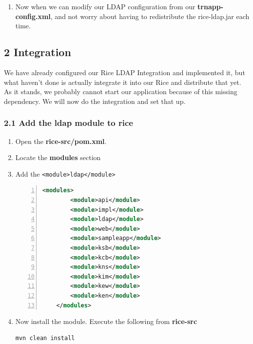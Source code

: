 \begin{enumerate}
\begin{lstlisting}[numbers=left,language=xml,basicstyle=\scriptsize,backgroundcolor=\color{ubergray},caption={trnapp-config.xml},frame=single,breaklines=true]
<param
name="config.location">classpath:META-INF/ldap-config.xml</param>
\lst{listing}
\item Since we are here, change the
  \textbf{rice.additionalSpringFiles} to refer to our new \textbf{KIMLdapSpringBeans.xml}

\begin{lstlisting}[numbers=left,language=xml,basicstyle=\scriptsize,backgroundcolor=\color{ubergray},caption={trnapp-config.xml},frame=single,breaklines=true]
   	<param
    name="rice.additionalSpringFiles">KIMLdapSpringBeans.xml</param>
\end{lstlisting}
\item Now when we can modify our LDAP configuration from our
  \textbf{trnapp-config.xml}, and not worry about having to
  redistribute the rice-ldap.jar each time.
\end{enumerate}

\subsection*{2 Integration}
We have already configured our Rice LDAP Integration and implemented
it, but what haven't done is actually integrate it into our Rice and
distribute that yet. As it stands, we probably cannot start our
application because of this missing dependency. We will now do the
integration and set that up.

\subsubsection*{2.1 Add the ldap module to rice}
\begin{enumerate}
\item Open the \textbf{rice-src/pom.xml}.
\item Locate the \textbf{modules} section
\item Add the \verb|<module>ldap</module>|

\begin{lstlisting}[numbers=left,language=xml,basicstyle=\scriptsize,backgroundcolor=\color{ubergray},caption={rice-src/pom.xml},frame=single,breaklines=true]
	<modules>
		<module>api</module>
		<module>impl</module>
		<module>ldap</module>
		<module>web</module>
		<module>sampleapp</module>
		<module>ksb</module>
		<module>kcb</module>
		<module>kns</module>
		<module>kim</module>
		<module>kew</module>
		<module>ken</module>
	</modules>
\end{lstlisting}
\item Now install the module. Execute the following from
  \textbf{rice-src}
\begin{lstlisting}[language=bash,basicstyle=\scriptsize,backgroundcolor=\color{ubergray},caption={Install
  the LDAP Integration Module},frame=single,breaklines=true]
mvn clean install
\end{lstlisting}
\end{enumerate}

